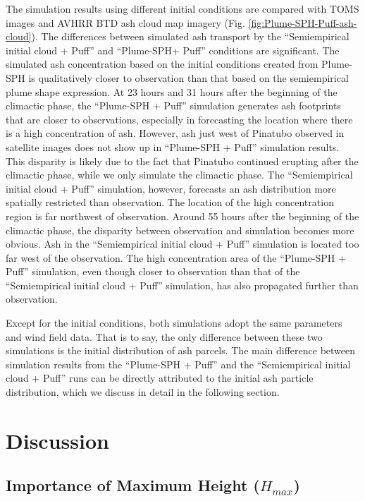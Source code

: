 \documentclass[utf8]{frontiersSCNS} %
\begin{document}
The simulation results using different initial conditions are compared with TOMS images and AVHRR BTD ash cloud map imagery (Fig. \ref{fig:Plume-SPH-Puff-ash-cloud}).  The differences between simulated ash transport by the ``Semiempirical initial cloud + Puff'' and ``Plume-SPH+ Puff'' conditions are significant. The simulated ash concentration based on the initial conditions created from Plume-SPH is qualitatively closer to observation than that based on the semiempirical plume shape expression. At 23 hours and 31 hours after the beginning of the climactic phase, the ``Plume-SPH + Puff'' simulation generates ash footprints that are  closer to observations, especially in forecasting the location where there is a high concentration of ash. However, ash just west of Pinatubo observed in satellite images does not show up in ``Plume-SPH + Puff'' simulation results. This disparity is likely due to the fact that Pinatubo continued erupting after the climactic phase, while we only simulate the climactic phase. The ``Semiempirical initial cloud + Puff'' simulation, however, forecasts an ash distribution more spatially restricted than observation. The location of the high concentration region is far northwest of observation.  Around 55 hours after the beginning of the climactic phase, the disparity between observation and simulation becomes more obvious. Ash in the ``Semiempirical initial cloud + Puff'' simulation is located too far west of the observation. The high concentration area of the ``Plume-SPH + Puff'' simulation, even though closer to observation than that of the ``Semiempirical initial cloud + Puff'' simulation, has also propagated further than observation.

Except for the initial conditions, both simulations adopt the same parameters and wind field data. That is to say, the only difference between these two simulations is the initial distribution of ash parcels. The main difference between simulation results from the ``Plume-SPH + Puff'' and the ``Semiempirical initial cloud + Puff'' runs can be directly attributed to the initial ash particle distribution, which we discuss in detail in the following section.


\section{Discussion}
\subsection{Importance of Maximum Height ($H_{max}$)}
\end{document}
